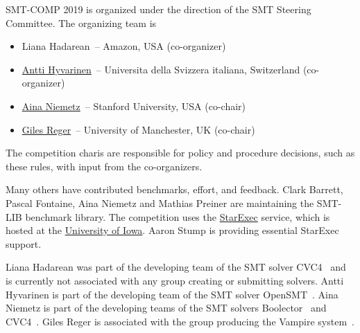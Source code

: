\documentclass[12pt]{article}
\begin{document}
SMT-COMP 2019 is organized under the direction of the SMT Steering
Committee. The organizing team is
%
\begin{itemize}
\setlength{\itemsep}{0pt}
\item
		Liana Hadarean~-- Amazon, USA (co-organizer)
\item \href{http://www.inf.usi.ch/postdoc/hyvarinen/}{Antti Hyvarinen}~--
		Universita della Svizzera italiana, Switzerland (co-organizer)
\item
  \href{http://cs.stanford.edu/people/niemetz}{Aina
    Niemetz}~-- Stanford University, USA (co-chair)
\item \href{http://www.cs.man.ac.uk/~regerg/}{Giles Reger}~--
  University of Manchester, UK (co-chair)
\end{itemize}
%
The competition charis are responsible for policy and procedure decisions,
such as these rules, with input from the co-organizers.

Many others have contributed benchmarks, effort, and feedback.  Clark Barrett,
Pascal Fontaine, Aina Niemetz and Mathias Preiner are maintaining the SMT-LIB
benchmark library.
The competition uses the
\href{https://www.starexec.org/}{StarExec} service, which is hosted at
the \href{http://www.cs.uiowa.edu/}{University of Iowa}.  Aaron Stump
is providing essential StarExec support.

%
Liana Hadarean was part of the developing team of the SMT solver
CVC4~\cite{cvc4} and is currently not associated with any group
creating or submitting solvers.
Antti Hyvarinen is part of the developing team of the SMT solver
OpenSMT~\cite{opensmt2}.
Aina Niemetz is part of the developing teams of the SMT solvers
Boolector~\cite{boolector}
and CVC4~\cite{cvc4}.
Giles Reger is associated with the group
producing the Vampire system~\cite{vampire}.





\end{document}

